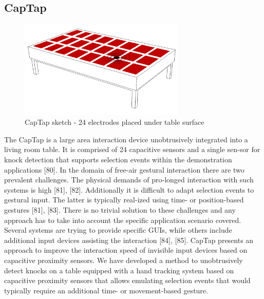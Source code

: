 \subsection{CapTap}
\begin{figure}[h]
\centering
\includegraphics[width=0.7\textwidth]{images/captap_v2}
\caption{CapTap sketch - 24 electrodes placed under table surface}
\label{fig:captap_sketch}
\end{figure}
The CapTap is a large area interaction device unobtrusively integrated into a living room table. It is comprised of 24 capacitive sensors and a single sen-sor for knock detection that supports selection events within the demonstration applications [80]. In the domain of free-air gestural interaction there are two prevalent challenges. The physical demands of pro-longed interaction with such systems  is high [81], [82]. Additionally it is difficult to adapt selection events to gestural input. The latter is typically real-ized using time- or position-based gestures [81], [83]. There is no trivial solution to these challenges and any approach has to take into account the specific application scenario covered. Several systems are trying to provide specific GUIs, while others include additional input devices assisting the interaction [84], [85]. CapTap presents an approach to improve the interaction speed of invisible input devices based on capacitive proximity sensors. We have developed a method to unobtrusively detect knocks on a table equipped with a hand tracking system based on capacitive proximity sensors that allows emulating selection events that would typically require an additional time- or movement-based gesture. 

